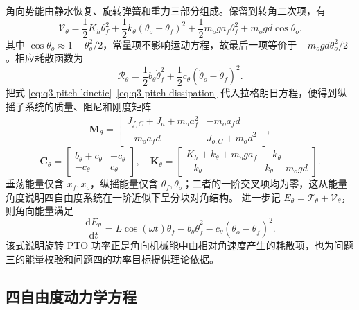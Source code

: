 \documentclass[withoutpreface]{../../../templates/CUMCM2026-Complete-LaTeX/cumcmthesis}
\begin{document}
角向势能由静水恢复、旋转弹簧和重力三部分组成。保留到转角二次项，有
\begin{equation}
  \mathcal V_\theta=
  \frac12K_h\theta_f^2
  +\frac12k_\theta(\theta_o-\theta_f)^2
  +\frac12m_oga_f\theta_f^2
  +m_ogd\cos\theta_o.
  \label{eq:q3-pitch-potential-exact}
\end{equation}
其中 $\cos\theta_o\approx1-\theta_o^2/2$，常量项不影响运动方程，故最后一项等价于 $-m_ogd\theta_o^2/2$。相应耗散函数为
\begin{equation}
  \mathcal R_\theta=
  \frac12b_\theta\dot\theta_f^2
  +\frac12c_\theta(\dot\theta_o-\dot\theta_f)^2.
  \label{eq:q3-pitch-dissipation}
\end{equation}
把式 \eqref{eq:q3-pitch-kinetic}--\eqref{eq:q3-pitch-dissipation} 代入拉格朗日方程，便得到纵摇子系统的质量、阻尼和刚度矩阵
\begin{equation}
  \boldsymbol M_\theta=
  \begin{bmatrix}
    J_{f,C}+J_a+m_oa_f^2&-m_oa_fd\\
    -m_oa_fd&J_{o,C}+m_od^2
  \end{bmatrix},
  \label{eq:q3-pitch-m-symbolic}
\end{equation}
\begin{equation}
  \boldsymbol C_\theta=
  \begin{bmatrix}b_\theta+c_\theta&-c_\theta\\-c_\theta&c_\theta\end{bmatrix},
  \quad
  \boldsymbol K_\theta=
  \begin{bmatrix}
    K_h+k_\theta+m_oga_f&-k_\theta\\
    -k_\theta&k_\theta-m_ogd
  \end{bmatrix}.
  \label{eq:q3-pitch-ck-symbolic}
\end{equation}
垂荡能量仅含 $x_f,x_o$，纵摇能量仅含 $\theta_f,\theta_o$；二者的一阶交叉项均为零，这从能量角度说明四自由度系统在一阶近似下呈分块对角结构。
进一步记 $E_\theta=\mathcal T_\theta+\mathcal V_\theta$，则角向能量满足
\begin{equation}
  \frac{\mathrm dE_\theta}{\mathrm dt}
  =L\cos(\omega t)\dot\theta_f
  -b_\theta\dot\theta_f^2
  -c_\theta(\dot\theta_o-\dot\theta_f)^2.
  \label{eq:q3-pitch-energy-balance}
\end{equation}
该式说明旋转 PTO 功率正是角向机械能中由相对角速度产生的耗散项，也为问题三的能量校验和问题四的功率目标提供理论依据。

\subsection{四自由度动力学方程}
\end{document}
